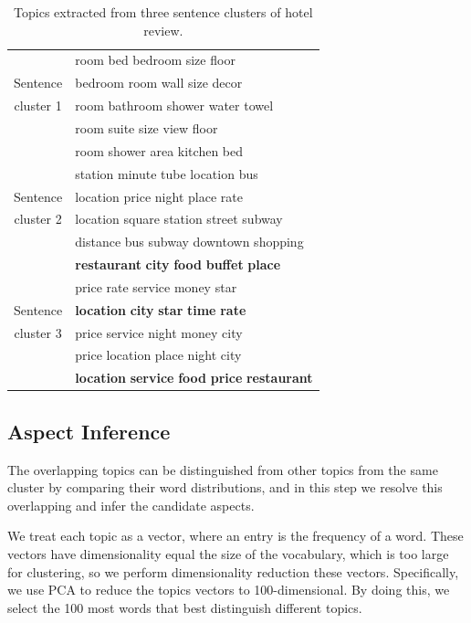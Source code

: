 \begin{table}[th]
\centering
\caption{Topics extracted from three sentence clusters of hotel review.}
\label{table:overlap}
\begin{tabular}{|c|l|}
\hline
& room bed bedroom size floor \\
Sentence
& bedroom room wall size decor \\
cluster 1
& room bathroom shower water towel \\
& room suite size view floor \\
& room shower area kitchen bed \\\hline

& station minute tube location bus \\
Sentence
& location price night place rate\\
cluster 2
& location square station street subway\\
& distance bus subway downtown shopping\\
& \textbf{restaurant} \textbf{city} \textbf{food} \textbf{buffet} \textbf{place} \\\hline

& price rate service money star\\
Sentence
& \textbf{location} \textbf{city} \textbf{star} \textbf{time} \textbf{rate} \\
cluster 3
& price service night money city\\
& price location place night city\\
& \textbf{location} \textbf{service} \textbf{food} \textbf{price} \textbf{restaurant} \\\hline
\end{tabular}
\end{table}


\subsection{Aspect Inference}
\label{sec:topic_clustering}

The overlapping topics can be distinguished from other topics from the 
same cluster by comparing their word distributions, 
and in this step we resolve this overlapping and infer the candidate
aspects.

We treat each topic as a vector, where an entry is the frequency of a word. 
These vectors have dimensionality equal the size of the vocabulary, which is too large for clustering, 
so we perform dimensionality reduction these vectors.
Specifically, we use PCA to reduce the topics vectors to 100-dimensional. 
By doing this, we select the 100 most words that best distinguish different topics.

